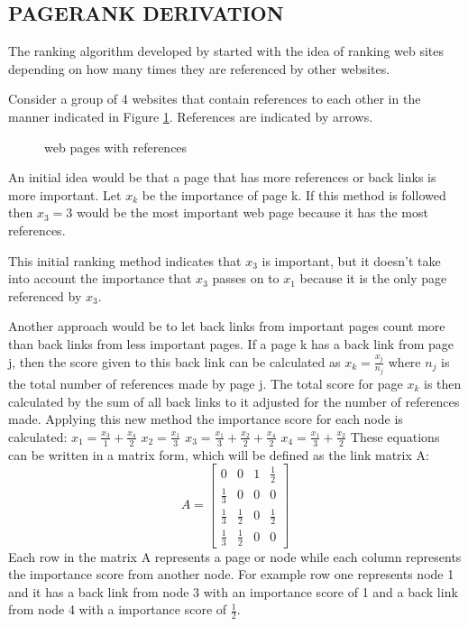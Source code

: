 \subsection{PAGERANK DERIVATION}

The ranking algorithm developed by \cite{bryan200625} started with the idea of ranking web sites depending on how many times they are referenced by other websites.

Consider a group of 4 websites that contain references to each other in the manner indicated in Figure \ref{fig:7}. References are indicated by arrows.\\
\begin{figure}[H]
	\centering{}
	\caption{web pages with references}\label{fig:7}
\end{figure}
An initial idea would be that a page that has more references or back links is more important. Let $x_{k}$ be the importance of page k. If this method is followed then $x_{3} = 3$ would be the most important web page because it has the most references.

This initial ranking method indicates that $x_{3}$ is important, but it doesn't take into account the importance that $x_{3}$ passes on to $x_{1}$ because it is the only page referenced by $x_{3}$.

Another approach would be to let back links from important pages count more than back links from less important pages. If a page k has a back link from page j, then the score given to this back link can be calculated as $x_{k} = \frac{x_{j}}{n_{j}}$ where $n_{j}$ is the total number of references made by page j. The total score for page $x_{k}$ is then calculated by the sum of all back links to it adjusted for the number of references made. Applying this new method the importance score for each node is calculated:
\newline $x_{1} = \frac{x_{3}}{1} + \frac{x_{4}}{2} $ 
\newline $x_{2} = \frac{x_{1}}{3} $
\newline $x_{3} = \frac{x_{1}}{3} + \frac{x_{2}}{2} + \frac{x_{4}}{2} $
\newline $x_{4} = \frac{x_{1}}{3} + \frac{x_{2}}{2} $
\newline These equations can be written in a matrix form, which will be defined as the link matrix A:
\newline 
\[A=\begin{bmatrix}
0           & 0           & 1 & \frac{1}{2} \\
\frac{1}{3} & 0           & 0 & 0           \\
\frac{1}{3} & \frac{1}{2} & 0 & \frac{1}{2} \\
\frac{1}{3} & \frac{1}{2} & 0 & 0
\end{bmatrix}\]
\newline Each row in the matrix A represents a page or node while each column  represents the importance score from another node. For example row one represents node 1 and it has a back link from node 3 with an importance score of 1 and a back link from node 4 with a importance score of $\frac{1}{2}$.

